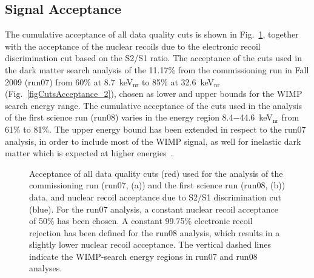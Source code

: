 \subsection{Signal Acceptance}
\label{secSignalAcceptance}

The cumulative acceptance of all data quality cuts is shown in Fig.~\ref{figCutsAcceptance}, together with the acceptance of the nuclear recoils due to the electronic recoil discrimination cut based on the S2/S1 ratio. The acceptance of the cuts used in the dark matter search analysis of the 11.17\% from the commissioning run in Fall 2009 (run07) from 60\% at 8.7~keV$_{\mathrm{nr}}$ to 85\% at 32.6~keV$_{\mathrm{nr}}$ (Fig.~\ref{figCutsAcceptance_2}), chosen as lower and upper bounds for the WIMP search energy range. The cumulative acceptance of the cuts used in the analysis of the first science run (run08) varies in the energy region 8.4$-$44.6~keV$_{\mathrm{nr}}$ from 61\% to 81\%. The upper energy bound has been extended in respect to the run07 analysis, in order to include most of the WIMP signal, as well for inelastic dark matter which is expected at higher energies~\cite{inelasticDM1, inelasticDM2}.

\begin{figure}[!h]
\centering
{}
\caption[Acceptance of all data quality cuts, excluding the S2/S1 discrimination, and nuclear recoil acceptance]{Acceptance of all data quality cuts (red) used for the analysis of the commissioning run (run07, (a)) and the first science run (run08, (b)) data, and nuclear recoil acceptance due to S2/S1 discrimination cut (blue). For the run07 analysis, a constant nuclear recoil acceptance of 50\% has been chosen. A constant 99.75\% electronic recoil rejection has been defined for the run08 analysis, which results in a slightly lower nuclear recoil acceptance. The vertical dashed lines indicate the WIMP-search energy regions in run07 and run08 analyses.}
\label{figCutsAcceptance}
\end{figure}

